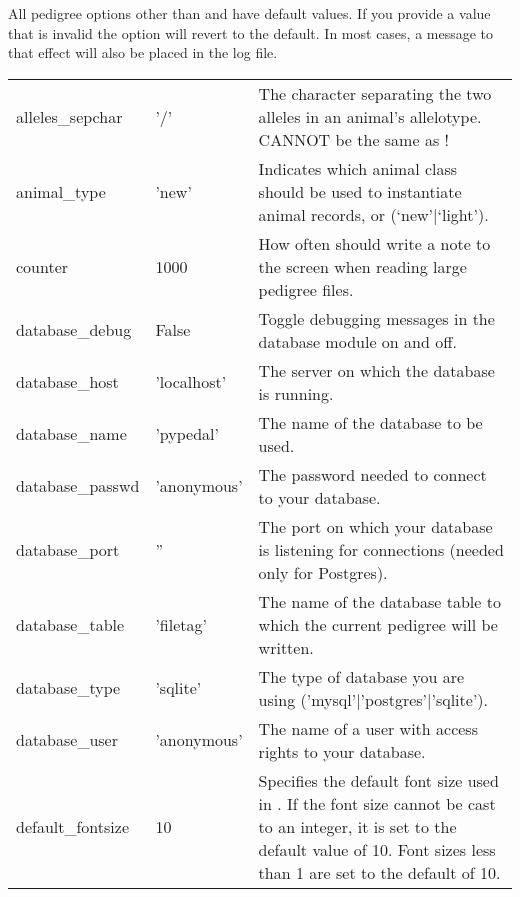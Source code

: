 All pedigree options other than  and  have default values.  If you provide a value that is invalid the option will revert to the default.  In most cases, a message to that effect will also be placed in the log file.
\begin{center}
    \tablelasttail{\hline}
    \label{tbl:options}
    \begin{xtabular}{l|l|p{4in}}
	alleles\_sepchar  & '/'          & The character separating the two alleles in an animal's allelotype.  CANNOT be the same as ! \\
	animal\_type  & 'new'            & Indicates which animal class should be used to instantiate animal records,  or  (`new'|`light'). \\
	counter          & 1000          & How often should \PyPedal{} write a note to the screen when reading large pedigree files. \\
	database\_debug  & False         & Toggle debugging messages in the database module on and off. \\
	database\_host   & 'localhost'   & The server on which the database is running. \\
	database\_name   & 'pypedal'     & The name of the database to be used. \\
	database\_passwd & 'anonymous'   & The password needed to connect to your database. \\
	database\_port   & ''            & The port on which your database is listening for connections (needed only for Postgres). \\
	database\_table  & 'filetag'     & The name of the database table to which the current pedigree will be written. \\
	database\_type   & 'sqlite'      & The type of database you are using ('mysql'|'postgres'|'sqlite'). \\
	database\_user   & 'anonymous'   & The name of a user with access rights to your database.  \\
	default\_fontsize & 10           & Specifies the default font size used in . If the font size cannot be cast to an integer, it is set to the default value of 10. Font sizes less than 1 are set to the default of 10. \\

\end{xtabular}
\end{center}
